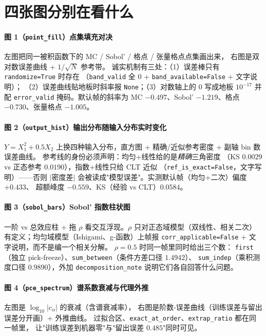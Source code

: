 \section{四张图分别在看什么}

\paragraph{图 1（\texttt{point\_fill}）点集填充对决}
左图把同一被积函数下的 MC / Sobol' / 格点 / 张量格点点集画出来，
右图是双对数误差曲线 + $1/\sqrt N$ 参考带。
诚实机制有三处：（1）误差棒只有 \texttt{randomize=True} 时存在
（\texttt{band\_valid} 全 $0$ + \texttt{band\_available=False} + 文字说明）；
（2）误差曲线贴地板时斜率报 \texttt{None}；（3）对数轴上的 $0$ 写成地板 $10^{-17}$
并配 \texttt{error\_valid} 掩码。默认帧的斜率为
MC $-0.497$、Sobol' $-1.219$、格点 $-0.730$、张量格点 $-1.005$。

\paragraph{图 2（\texttt{output\_hist}）输出分布随输入分布实时变化}
$Y=X_1^2+0.5X_2$ 上换四种输入分布，直方图 + 精确/近似参考密度 + 副轴 bin 数误差曲线。
参考线的身份必须声明：均匀+线性给的是\emph{精确}三角密度
（KS $0.0029$ vs 正态参考 $0.0190$），指数+线性只给 CLT 近似
（\texttt{ref\_is\_exact=False}，文字写明）——否则 $\lvert$密度差$\rvert$
会被读成"模型误差"。实测默认帧（均匀+二次）偏度 $+0.433$、
超额峰度 $-0.559$、KS（经验 vs CLT）$0.0584$。

\paragraph{图 3（\texttt{sobol\_bars}）Sobol' 指数柱状图}
一阶 vs 总效应柱 + 拖 $\rho$ 看交互浮现。$\rho$ 只对正态域模型（双线性、相关二次）
有定义；均匀域模型（Ishigami、g-函数）上帧报
\texttt{corr\_applicable=False} + 文字说明，而不是编一个相关分解。
$\rho=0.5$ 时同一帧里同时给出三个数：
\texttt{first}（独立 pick-freeze）、\texttt{sum\_between}（条件方差口径 $1.4942$）、
\texttt{sum\_indep}（乘积测度口径 $0.9890$），外加
\texttt{decomposition\_note} 说明它们各自回答什么问题。

\paragraph{图 4（\texttt{pce\_spectrum}）谱系数衰减与代理外推}
左图是 $\log_{10}\lvert c_\alpha\rvert$ 的衰减（含谱衰减率），
右图是阶数-误差曲线（训练误差与留出误差分开画）+ 外推曲线。
过拟合区、\texttt{exact\_at\_order}、\texttt{extrap\_ratio} 都在同一帧里，
让"训练误差到机器零"与"留出误差 $0.485$"同时可见。

